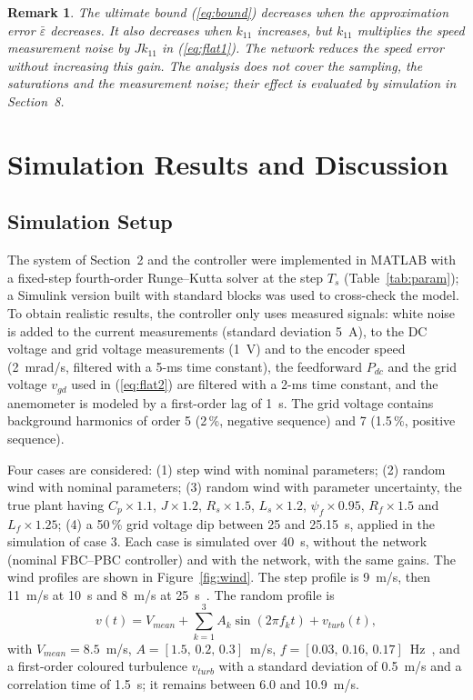 \documentclass[11pt,a4paper]{article}
\newtheorem{remark}{Remark}
\begin{document}
\begin{remark}
The ultimate bound (\ref{eq:bound}) decreases when the approximation error $\bar\varepsilon$ decreases.
It also decreases when $k_{11}$ increases, but $k_{11}$ multiplies the speed measurement noise by
$Jk_{11}$ in (\ref{eq:flat1}). The network reduces the speed error without increasing this gain. The
analysis does not cover the sampling, the saturations and the measurement noise; their effect is
evaluated by simulation in Section~8.
\end{remark}

\section{Simulation Results and Discussion}
\subsection{Simulation Setup}
The system of Section~2 and the controller were implemented in MATLAB with a fixed-step fourth-order
Runge--Kutta solver at the step $T_s$ (Table~\ref{tab:param}); a Simulink version built with standard
blocks was used to cross-check the model. To obtain realistic results, the controller only uses measured
signals: white noise is added to the current measurements (standard deviation 5~A), to the DC voltage and
grid voltage measurements (1~V) and to the encoder speed (2~mrad/s, filtered with a 5-ms time constant),
the feedforward $P_{dc}$ and the grid voltage $v_{gd}$ used in (\ref{eq:flat2}) are filtered with a 2-ms
time constant, and the anemometer is modeled by a first-order lag of 1~s. The grid voltage contains
background harmonics of order 5 (2\,\%, negative sequence) and 7 (1.5\,\%, positive sequence).

Four cases are considered: (1) step wind with nominal parameters; (2) random wind with nominal
parameters; (3) random wind with parameter uncertainty, the true plant having $C_p\times1.1$, $J\times1.2$,
$R_s\times1.5$, $L_s\times1.2$, $\psi_f\times0.95$, $R_f\times1.5$ and $L_f\times1.25$; (4) a 50\,\% grid
voltage dip between 25 and 25.15~s, applied in the simulation of case 3. Each case is simulated over
40~s, without the network (nominal FBC--PBC controller) and with the network, with the same gains. The wind
profiles are shown in Figure~\ref{fig:wind}. The step profile is 9~m/s, then 11~m/s at 10~s and 8~m/s at
25~s~\cite{aimene2022}. The random profile is
\begin{equation}
v(t) = V_{mean} + \sum_{k=1}^{3} A_k\sin(2\pi f_k t) + v_{turb}(t) ,
\label{eq:wind}
\end{equation}
with $V_{mean}=8.5$~m/s, $A=[1.5,\,0.2,\,0.3]$~m/s, $f=[0.03,\,0.16,\,0.17]$~Hz~\cite{regani2026}, and a
first-order coloured turbulence $v_{turb}$ with a standard deviation of 0.5~m/s and a correlation time of
1.5~s; it remains between 6.0 and 10.9~m/s.
\end{document}

